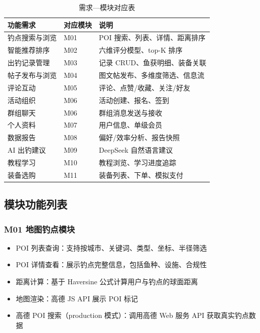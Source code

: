 \documentclass[12pt,a4paper]{ctexart}
\begin{document}
\begin{table}[H]
  \centering
  \caption{需求—模块对应表}
  \label{tab:req-module}
  \begin{tabular}{p{3cm}p{3cm}p{6cm}}
    \toprule
    \textbf{功能需求} & \textbf{对应模块} & \textbf{说明} \\
    \midrule
    钓点搜索与浏览 & M01 & POI 搜索、列表、详情、距离排序 \\
    智能推荐排序 & M02 & 六维评分模型、top-K 排序 \\
    出钓记录管理 & M03 & 记录 CRUD、鱼获明细、装备关联 \\
    帖子发布与浏览 & M04 & 图文帖发布、多维度筛选、信息流 \\
    评论互动 & M05 & 评论、点赞/收藏、关注/好友 \\
    活动组织 & M06 & 活动创建、报名、签到 \\
    群组聊天 & M06 & 群组消息发送与接收 \\
    个人资料 & M07 & 用户信息、单级会员 \\
    数据报告 & M08 & 偏好/效率分析、报告快照 \\
    AI 出钓建议 & M09 & DeepSeek 自然语言建议 \\
    教程学习 & M10 & 教程浏览、学习进度追踪 \\
    装备选购 & M11 & 装备列表、下单、模拟支付 \\
    \bottomrule
  \end{tabular}
\end{table}

\subsection{模块功能列表}

\subsubsection{M01 地图钓点模块}

\begin{itemize}
  \item POI 列表查询：支持按城市、关键词、类型、坐标、半径筛选
  \item POI 详情查看：展示钓点完整信息，包括鱼种、设施、合规性
  \item 距离计算：基于 Haversine 公式计算用户与钓点的球面距离
  \item 地图渲染：高德 JS API 展示 POI 标记
  \item 高德 POI 搜索（production 模式）：调用高德 Web 服务 API 获取真实钓点数据
\end{itemize}
\end{document}
